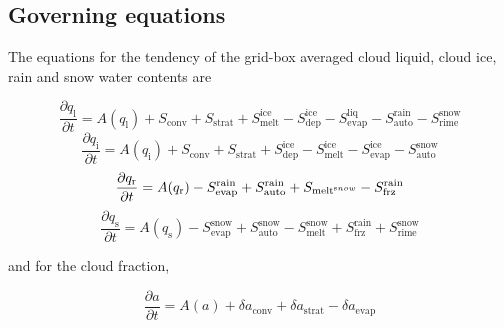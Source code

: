 \documentclass[
a4paper,     %
12pt,        %
article,
onecolumn,   %
openany,     %
]{memoir}
\begin{document}
\subsection{Governing equations}
The equations for the tendency of the grid-box averaged cloud
liquid, cloud ice, rain and snow water contents are

\begin{equation}
\frac{\partial q_{\text{l}}}{\partial t} =A(q_{\text{l}}) +S_{\text{conv}} 
+S_{\text{strat}}+S_{\text{melt}}^{\text{ice}}-S_{\text{dep}}^{\text{ice}}
-S_{\text{evap}}^{\text{liq}}-S_{\text{auto}}^{\text{rain}}-S_{\text {rime}}^{\text{snow}}
\end{equation}
\begin{equation}
\frac{\partial q_{\text{i}}}{\partial t} =A(q_{\text{i}}) +S_{\text{conv}} 
+S_{\text{strat}}+S_{\text{dep}}^{\text{ice}}-S_{\text{melt}}^{\text{ice}}
-S_{\text{evap}}^{\text{ice}}-S_{\text{auto}}^{\text{snow}}
\end{equation}
\begin{equation}
\frac{\partial q_{\text{r}}}{\partial t} =A(q_{\text{r}}) 
-S_{\text{evap}}^{\text{rain}}+S_{\text{auto}}^{\text{rain}}+S_{\text{melt}^{\text snow}} 
-S_{\text{frz}}^{\text{rain}}  
\end{equation}
\begin{equation}
\frac{\partial q_{\text{s}}}{\partial t} =A(q_{\text{s}}) 
-S_{\text{evap}}^{\text{snow}}+S_{\text{auto}}^{\text{snow}}-S_{\text{melt}}^{\text{snow}} 
+S_{\text{frz}}^{\text{rain}}+S_{\text{rime}}^{\text{snow}}
\end{equation}

and for the cloud fraction,

\begin{equation}
\frac{\partial a}{\partial t} =A(a) +\delta a_{\text{conv}} 
+\delta a_{\text{strat}}-\delta a_{\text{evap}}
\end{equation}
\end{document}
